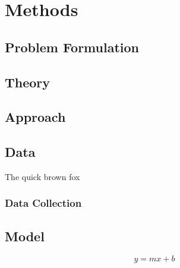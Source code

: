 \chapter{Methods}
\section{Problem Formulation}
\section{Theory}
\section{Approach}
\section{Data}
\lipsum[12]
\begin{table}
  \centering
  \caption{The quick brown fox}
  
\end{table}
\lipsum[13]
\subsection{Data Collection}
\lipsum[16]
\section{Model}
\lipsum[20]
\begin{equation}
  y = mx + b
\end{equation}
\lipsum[22-25]